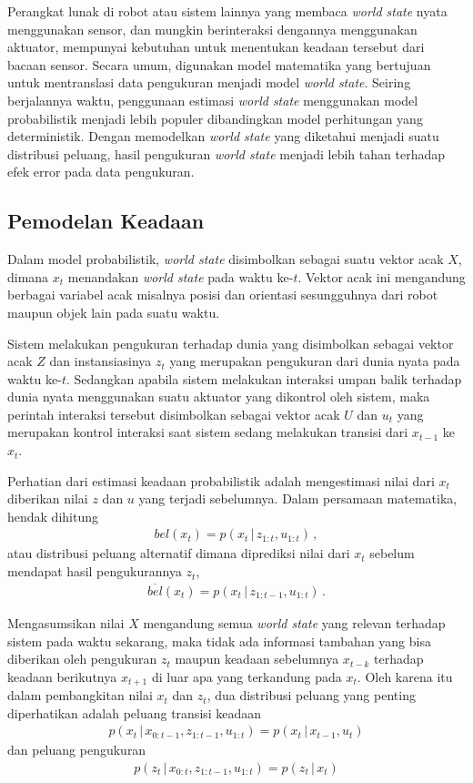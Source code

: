 Perangkat lunak di robot atau sistem lainnya yang membaca \textit{world state} nyata menggunakan sensor, dan mungkin berinteraksi dengannya menggunakan aktuator, mempunyai kebutuhan untuk menentukan keadaan tersebut dari bacaan sensor. Secara umum, digunakan model matematika yang bertujuan untuk mentranslasi data pengukuran menjadi model \textit{world state}. Seiring berjalannya waktu, penggunaan estimasi \textit{world state} menggunakan model probabilistik menjadi lebih populer dibandingkan model perhitungan yang deterministik. Dengan memodelkan \textit{world state} yang diketahui menjadi suatu distribusi peluang, hasil pengukuran \textit{world state} menjadi lebih tahan terhadap efek error pada data pengukuran. \citep{thrun2010}

\subsection{Pemodelan Keadaan}

Dalam model probabilistik, \textit{world state} disimbolkan sebagai suatu vektor acak $X$, dimana $x_t$ menandakan \textit{world state} pada waktu ke-$t$. Vektor acak ini mengandung berbagai variabel acak misalnya posisi dan orientasi sesungguhnya dari robot maupun objek lain pada suatu waktu.

Sistem melakukan pengukuran terhadap dunia yang disimbolkan sebagai vektor acak $Z$ dan instansiasinya $z_t$ yang merupakan pengukuran dari dunia nyata pada waktu ke-$t$. Sedangkan apabila sistem melakukan interaksi umpan balik terhadap dunia nyata menggunakan suatu aktuator yang dikontrol oleh sistem, maka perintah interaksi tersebut disimbolkan sebagai vektor acak $U$ dan $u_t$ yang merupakan kontrol interaksi saat sistem sedang melakukan transisi dari $x_{t-1}$ ke $x_t$.

Perhatian dari estimasi keadaan probabilistik adalah mengestimasi nilai dari $x_t$ diberikan nilai $z$ dan $u$ yang terjadi sebelumnya. Dalam persamaan matematika, hendak dihitung
\begin{align}
    bel(x_t) = p(x_t \,|\, z_{1:t}, u_{1:t}) \,,
\end{align}
atau distribusi peluang alternatif dimana diprediksi nilai dari $x_t$ sebelum mendapat hasil pengukurannya $z_t$,
\begin{align}
    \overline{bel}(x_t) = p(x_t \,|\, z_{1:t-1}, u_{1:t}) \,.
\end{align}

Mengasumsikan nilai $X$ mengandung semua \textit{world state} yang relevan terhadap sistem pada waktu sekarang, maka tidak ada informasi tambahan yang bisa diberikan oleh pengukuran $z_t$ maupun keadaan sebelumnya $x_{t-k}$ terhadap keadaan berikutnya $x_{t+1}$ di luar apa yang terkandung pada $x_t$. Oleh karena itu dalam pembangkitan nilai $x_t$ dan $z_t$, dua distribusi peluang yang penting diperhatikan adalah peluang transisi keadaan
\begin{align}
    p(x_t \,|\, x_{0:t-1}, z_{1:t-1}, u_{1:t}) = p(x_t \,|\, x_{t-1}, u_t)
\end{align}
dan peluang pengukuran
\begin{align}
    p(z_t \,|\, x_{0:t}, z_{1:t-1}, u_{1:t}) = p(z_t \,|\, x_t)
\end{align}

